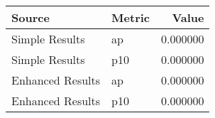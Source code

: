 \begin{tabular}{llr}
\toprule
Source & Metric & Value \\
\midrule
Simple Results & ap & 0.000000 \\
Simple Results & p10 & 0.000000 \\
Enhanced Results & ap & 0.000000 \\
Enhanced Results & p10 & 0.000000 \\
\bottomrule
\end{tabular}
